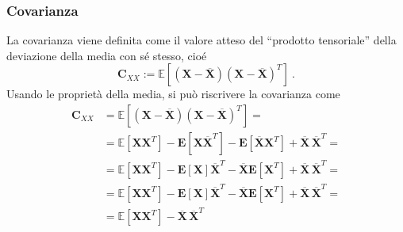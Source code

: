 \subsubsection{Covarianza}
La covarianza viene definita come il valore atteso del ``prodotto tensoriale'' della deviazione della media con sé stesso, cioé
\begin{equation}
    \mathbf{C}_{XX} := \mathbb{E}[(\mathbf{X} - \overline{\mathbf{X}})(\mathbf{X} - \overline{\mathbf{X}})^T] \  .
\end{equation}
Usando le proprietà della media, si può riscrivere la covarianza come
\begin{equation}
\begin{aligned}
    \mathbf{C}_{XX} & = \mathbb{E}[(\mathbf{X} - \overline{\mathbf{X}})(\mathbf{X} - \overline{\mathbf{X}})^T] = \\
    & = \mathbb{E}[\mathbf{X} \mathbf{X}^T] - \mathbf{E}[\mathbf{X}\overline{\mathbf{X}}^T] - \mathbf{E}[\overline{\mathbf{X}}\mathbf{X}^T] + \overline{\mathbf{X}} \, \overline{\mathbf{X}}^T = \\
    & = \mathbb{E}[\mathbf{X} \mathbf{X}^T] - \mathbf{E}[\mathbf{X}]\overline{\mathbf{X}}^T - \overline{\mathbf{X}}\mathbf{E}[\mathbf{X}^T] + \overline{\mathbf{X}} \, \overline{\mathbf{X}}^T = \\
    & = \mathbb{E}[\mathbf{X} \mathbf{X}^T] - \mathbf{E}[\mathbf{X}]\overline{\mathbf{X}}^T - \overline{\mathbf{X}}\mathbf{E}[\mathbf{X}^T] + \overline{\mathbf{X}} \, \overline{\mathbf{X}}^T = \\
    & = \mathbb{E}[\mathbf{X} \mathbf{X}^T] - \overline{\mathbf{X}} \, \overline{\mathbf{X}}^T 
\end{aligned}
\end{equation}


